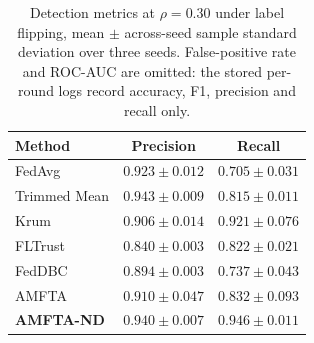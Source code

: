 \begin{table}[H]
	\caption{Detection metrics at $\rho=0.30$ under label flipping, mean $\pm$ across-seed sample standard deviation over three seeds. False-positive rate and ROC-AUC are omitted: the stored per-round logs record accuracy, F1, precision and recall only.}
	\label{tab:idsmetrics}
	\centering
	\begin{tabular}{@{}lcc@{}}
		\toprule
		\textbf{Method} & \textbf{Precision} & \textbf{Recall}\\
		\midrule
		FedAvg & $0.923\pm0.012$ & $0.705\pm0.031$\\
		Trimmed Mean & $0.943\pm0.009$ & $0.815\pm0.011$\\
		Krum & $0.906\pm0.014$ & $0.921\pm0.076$\\
		FLTrust & $0.840\pm0.003$ & $0.822\pm0.021$\\
		FedDBC & $0.894\pm0.003$ & $0.737\pm0.043$\\
		AMFTA & $0.910\pm0.047$ & $0.832\pm0.093$\\
		\textbf{AMFTA-ND} & $0.940\pm0.007$ & $0.946\pm0.011$\\
		\bottomrule
	\end{tabular}
\end{table}
